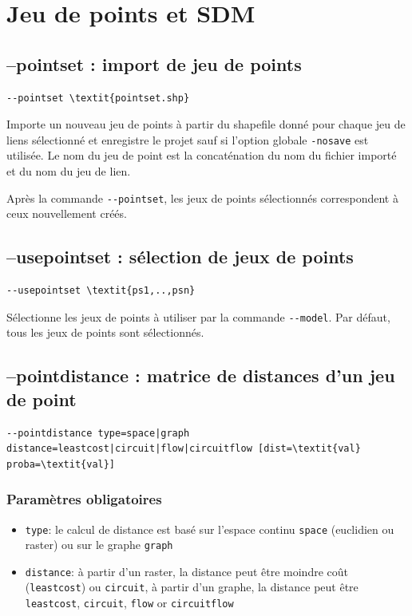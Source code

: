 \documentclass[a4paper,10pt]{report}
\begin{document}
\section{Jeu de points et SDM}
\subsection{--pointset : import de jeu de points}
\begin{Verbatim}[commandchars=\\\{\}]
--pointset \textit{pointset.shp}
\end{Verbatim}
Importe un nouveau jeu de points à partir du shapefile donné pour chaque jeu de liens sélectionné et enregistre le projet sauf si l'option globale \verb|-nosave| est utilisée.
Le nom du jeu de point est la concaténation du nom du fichier importé et du nom du jeu de lien.

Après la commande \verb|--pointset|, les jeux de points sélectionnés correspondent à ceux nouvellement créés.

\subsection{--usepointset : sélection de jeux de points}
\begin{Verbatim}[commandchars=\\\{\}]
--usepointset \textit{ps1,..,psn}
\end{Verbatim}
Sélectionne les jeux de points à utiliser par la commande \verb|--model|.
Par défaut, tous les jeux de points sont sélectionnés.

\subsection{--pointdistance : matrice de distances d'un jeu de point}
\begin{Verbatim}[commandchars=\\\{\}]
--pointdistance type=space|graph distance=leastcost|circuit|flow|circuitflow [dist=\textit{val} proba=\textit{val}]
\end{Verbatim}

\subsubsection{Paramètres obligatoires}
\begin{itemize}
	\item \verb|type|: le calcul de distance est basé sur l'espace continu \verb|space| (euclidien ou raster) ou sur le graphe \verb|graph|
	\item \verb|distance|: à partir d'un raster, la distance peut être moindre coût (\verb|leastcost|) ou \verb|circuit|, à partir d'un graphe, la distance peut être \verb|leastcost|, \verb|circuit|, \verb|flow| or \verb|circuitflow|
\end{itemize}
\end{document}
